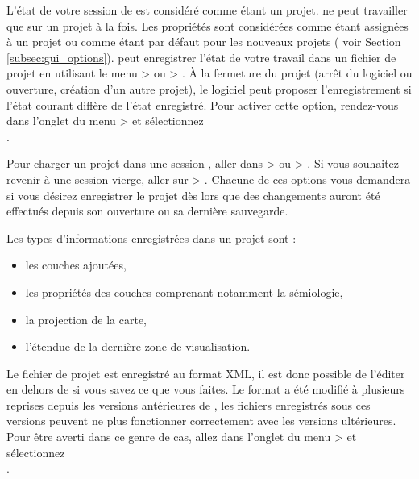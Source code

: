 L'état de votre session de \qg est considéré comme étant un projet. \qg ne peut travailler que sur un projet à la fois. Les propriétés sont considérées comme étant assignées à un projet ou comme étant par défaut pour les nouveaux projets ( voir Section \ref{subsec:gui_options}). \qg peut enregistrer l'état de votre travail dans un fichier de projet en utilisant le menu  >  ou  > . À la fermeture du projet (arrêt du logiciel ou ouverture, création d'un autre projet), le logiciel peut proposer l'enregistrement si l'état courant diffère de l'état enregistré. Pour activer cette option, rendez-vous dans l'onglet  du menu  >  et sélectionnez\\
.


Pour charger un projet dans une session \qg, aller dans  >  ou  > . Si vous souhaitez revenir à une session vierge, aller sur  > .
Chacune de ces options vous demandera si vous désirez enregistrer le projet dès lors que des changements auront été effectués depuis son ouverture ou sa dernière sauvegarde.

Les types d'informations enregistrées dans un projet sont :

\begin{itemize}[label=--]
\item les couches ajoutées,
\item les propriétés des couches comprenant notamment la sémiologie,
\item la projection de la carte,
\item l'étendue de la dernière zone de visualisation.
\end{itemize}

Le fichier de projet est enregistré au format XML, il est donc possible de l'éditer en dehors de \qg si vous savez ce que vous faites. Le format a été modifié à plusieurs reprises depuis les versions antérieures de \qg, les fichiers enregistrés sous ces versions peuvent ne plus fonctionner correctement avec les versions ultérieures. Pour être averti dans ce genre de cas, allez dans l'onglet  du menu  >  et sélectionnez\\
.

